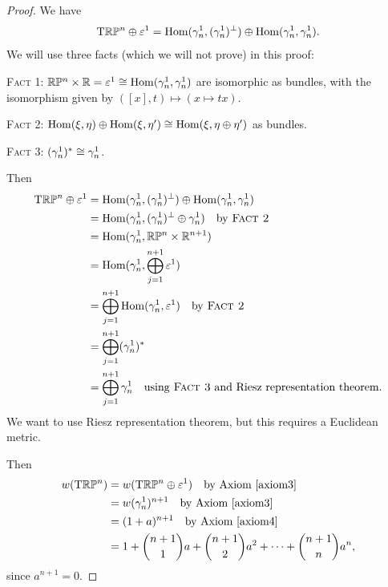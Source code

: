 \begin{proof}
We have
\begin{equation}
\mathrm{T}\mathbb{R}\mathbb{P}^{n}\oplus\varepsilon^{1}=\operatorname{Hom}(\gamma^{1}_{n},(\gamma^{1}_{n})^{\perp})\oplus\operatorname{Hom}(\gamma^{1}_{n},\gamma^{1}_{n}).
\end{equation}
We will use three facts (which we will not prove) in this proof:

\textsc{Fact 1}: $\mathbb{R}\mathbb{P}^{n}\times\mathbb{R}=\varepsilon^{1}\cong\operatorname{Hom}(\gamma^{1}_{n},\gamma^{1}_{n})$
are isomorphic as bundles, with the isomorphism given by
$([x],t)\mapsto(x\mapsto tx)$.

\textsc{Fact 2}: $\operatorname{Hom}(\xi,\eta)\oplus\operatorname{Hom}(\xi,\eta')\cong\operatorname{Hom}(\xi,\eta\oplus\eta')$
as bundles.

\textsc{Fact 3}: $(\gamma^{1}_{n})^{*}\cong\gamma^{1}_{n}$.

Then
\begin{subequations}
  \begin{align}
\mathrm{T}\mathbb{R}\mathbb{P}^{n}\oplus\varepsilon^{1}
&=\operatorname{Hom}(\gamma^{1}_{n},(\gamma^{1}_{n})^{\perp})\oplus\operatorname{Hom}(\gamma^{1}_{n},\gamma^{1}_{n})\\
&=\operatorname{Hom}(\gamma^{1}_{n},(\gamma^{1}_{n})^{\perp}\oplus\gamma^{1}_{n})\quad\mbox{by \textsc{Fact 2}}\\
&=\operatorname{Hom}(\gamma^{1}_{n},\mathbb{R}\mathbb{P}^{n}\times\mathbb{R}^{n+1})\\
&=\operatorname{Hom}(\gamma^{1}_{n},\bigoplus^{n+1}_{j=1}\varepsilon^{1})\\
&=\bigoplus^{n+1}_{j=1}\operatorname{Hom}(\gamma^{1}_{n},\varepsilon^{1})\quad\mbox{by \textsc{Fact~2}}\\
&=\bigoplus^{n+1}_{j=1}(\gamma^{1}_{n})^{*}\\
&=\bigoplus^{n+1}_{j=1}\gamma^{1}_{n}\quad\mbox{using \textsc{Fact 3} and Riesz representation theorem}.
  \end{align}
\end{subequations}
We want to use Riesz representation theorem, but this requires a
Euclidean metric.

Then
\begin{subequations}
  \begin{align}
w(\mathrm{T}\mathbb{R}\mathbb{P}^{n})
&=w(\mathrm{T}\mathbb{R}\mathbb{P}^{n}\oplus\varepsilon^{1})\quad\mbox{by Axiom~\ref{axiom3}}\\
&=w(\gamma^{1}_{n})^{n+1}\quad\mbox{by Axiom~\ref{axiom3}}\\
&=(1+a)^{n+1}\quad\mbox{by Axiom~\ref{axiom4}}\\
&=1+\binom{n+1}{1}a+\binom{n+1}{2}a^{2}+\dots+\binom{n+1}{n}a^{n},
  \end{align}
\end{subequations}
since $a^{n+1}=0$.
\end{proof}

